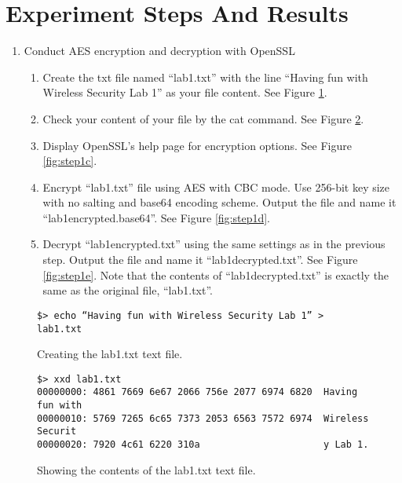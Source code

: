 \documentclass{article}
\begin{document}

\section{Experiment Steps And Results}

\begin{enumerate}
\item Conduct AES encryption and decryption with OpenSSL
    \begin{enumerate}
        \item Create the txt file named ``lab1.txt'' with the line ``Having
               fun with Wireless Security Lab 1'' as your file content. See Figure \ref{fig:step1a}.
        \item Check your content of your file by the cat command. See Figure
               \ref{fig:step1b}. 
        \item Display OpenSSL's help page for encryption options. See Figure \ref{fig:step1c}.
        \item Encrypt ``lab1.txt'' file using AES with CBC mode. Use 256-bit key size 
              with no salting and base64 encoding scheme. Output the file and name it
              ``lab1\textunderscore encrypted.base64''. See Figure \ref{fig:step1d}.
        \item Decrypt ``lab1\textunderscore encrypted.txt” using the same settings as in the previous
              step. Output the file and name it ``lab1\textunderscore decrypted.txt''.
              See Figure \ref{fig:step1e}. Note that the contents of
              ``lab1\textunderscore decrypted.txt'' is exactly the same as the original file,
              ``lab1.txt''.
    \end{enumerate}
\end{enumerate}

\begin{figure}
\begin{mdframed}
\begin{lstlisting}
$> echo “Having fun with Wireless Security Lab 1” > lab1.txt
\end{lstlisting}
\end{mdframed}
\caption{Creating the lab1.txt text file.}
\label{fig:step1a}
\end{figure}

\begin{figure}
\begin{mdframed}
\begin{lstlisting}
$> xxd lab1.txt
00000000: 4861 7669 6e67 2066 756e 2077 6974 6820  Having fun with 
00000010: 5769 7265 6c65 7373 2053 6563 7572 6974  Wireless Securit
00000020: 7920 4c61 6220 310a                      y Lab 1.
\end{lstlisting}
\end{mdframed}
\caption{Showing the contents of the lab1.txt text file.}
\label{fig:step1b}
\end{figure}
\end{document}

